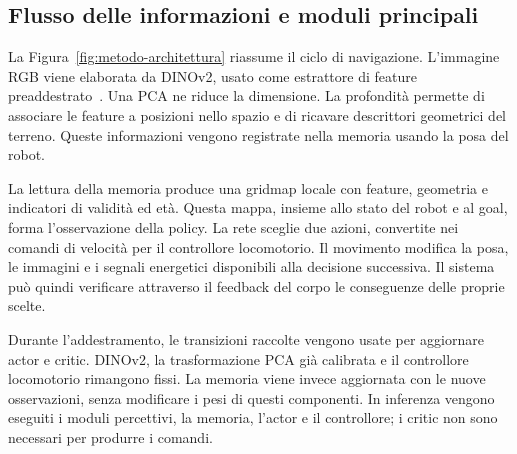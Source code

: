\begin{table}[tbp]
    \centering
    \caption[Proprietà geometriche e fisiche dei terreni]{Caratteristiche delle superfici simulate. I parametri descrivono i materiali assegnati al terreno; l'attrito effettivo dipende anche dal materiale del piede.}
    \label{tab:metodo-terreni}
\end{table}

\subsection{Flusso delle informazioni e moduli principali}

La Figura~\ref{fig:metodo-architettura} riassume il ciclo di navigazione. L'immagine RGB viene elaborata da DINOv2, usato come estrattore di feature preaddestrato~\citep{Oquab2023DINOv2}. Una PCA ne riduce la dimensione. La profondità permette di associare le feature a posizioni nello spazio e di ricavare descrittori geometrici del terreno. Queste informazioni vengono registrate nella memoria usando la posa del robot.

La lettura della memoria produce una gridmap locale con feature, geometria e indicatori di validità ed età. Questa mappa, insieme allo stato del robot e al goal, forma l'osservazione della policy. La rete sceglie due azioni, convertite nei comandi di velocità per il controllore locomotorio. Il movimento modifica la posa, le immagini e i segnali energetici disponibili alla decisione successiva. Il sistema può quindi verificare attraverso il feedback del corpo le conseguenze delle proprie scelte.

Durante l'addestramento, le transizioni raccolte vengono usate per aggiornare actor e critic. DINOv2, la trasformazione PCA già calibrata e il controllore locomotorio rimangono fissi. La memoria viene invece aggiornata con le nuove osservazioni, senza modificare i pesi di questi componenti. In inferenza vengono eseguiti i moduli percettivi, la memoria, l'actor e il controllore; i critic non sono necessari per produrre i comandi.

